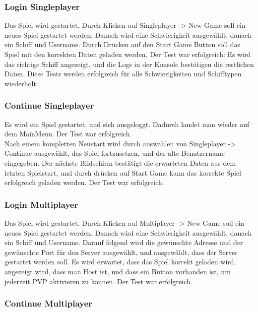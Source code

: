 \documentclass[fontsize=12pt,paper=a4,twoside]{scrartcl}
\begin{document}
\subsubsection{Login Singleplayer}
Das Spiel wird gestartet. Durch Klicken auf Singleplayer -> New Game soll ein neues Spiel gestartet werden. Danach wird eine Schwierigkeit ausgewählt, danach ein Schiff und Username. Durch Drücken auf den Start Game Button soll das Spiel mit den korrekten Daten geladen werden. Der Test war erfolgreich: Es wird das richtige Schiff angezeigt, und die Logs in der Konsole bestätigen die restlichen Daten. Diese Tests werden erfolgreich für alle Schwierigkeiten und Schifftypen wiederholt. \\
\subsubsection{Continue Singleplayer}
Es wird ein Spiel gestartet, und sich ausgeloggt. Dadurch landet man wieder auf dem MainMenu. Der Test war erfolgreich. \\
Nach einem kompletten Neustart wird durch auswählen von Singleplayer -> Continue ausgewählt, das Spiel fortzusetzen, und der alte Benutzername eingegeben. Der nächste Bildschirm bestätigt die erwarteten Daten aus dem letzten Spielstart, und durch drücken auf Start Game kann das korrekte Spiel erfolgreich geladen werden. Der Test war erfolgreich. \\
\subsubsection{Login Multiplayer}
Das Spiel wird gestartet. Durch Klicken auf Multiplayer -> New Game soll ein neues Spiel gestartet werden. Danach wird eine Schwierigkeit ausgewählt, danach ein Schiff und Username. Darauf folgend wird die gewünschte Adresse und der gewünschte Port für den Server ausgewählt, und ausgewählt, dass der Server gestartet werden soll. Es wird erwartet, dass das Spiel korrekt geladen wird, angezeigt wird, dass man Host ist, und dass ein Button vorhanden ist, um jederzeit PVP aktivieren zu können. Der Test war erfolgreich. \\
\subsubsection{Continue Multiplayer}
\end{document}
